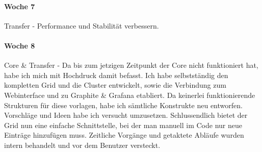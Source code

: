 \paragraph{Woche 7}
Transfer - Performance und Stabilität verbessern.
\paragraph{Woche 8}
Core \& Transfer - Da bis zum jetzigen Zeitpunkt der Core nicht funktioniert hat, habe ich mich mit Hochdruck damit befasst. Ich habe selbstständig den kompletten Grid und die Cluster entwickelt, sowie die Verbindung zum Webinterface und zu Graphite \& Grafana etabliert. Da keinerlei funktionierende Strukturen für diese vorlagen, habe ich sämtliche Konstrukte neu entworfen. Vorschläge und Ideen habe ich versucht umzusetzen. Schlussendlich bietet der Grid nun eine einfache Schnittstelle, bei der man manuell im Code nur neue Einträge hinzufügen muss. Zeitliche Vorgänge und getaktete Abläufe wurden intern behandelt und vor dem Benutzer versteckt.